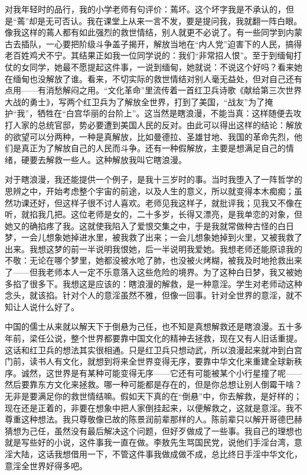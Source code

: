对我年轻时的品行，我的小学老师有句评价：蔫坏。这个坏字我是不承认的，但是“蔫”却是无可否认。我在课堂上从来一言不发，要是提问我，我就翻一阵白眼。像我这样的蔫人都有如此强烈的救世情结，别人就更不必说了。有一些同学到内蒙古去插队，一心要把阶级斗争盖子揭开，解放当地在“内人党”迫害下的人民，搞得老百姓鸡犬不宁。其结果正如我一位同学说的：我们“非常招人恨”。至于到缅甸打仗的女同学，她最不愿提起这件事，一说到缅甸，她就说：不说这个好吗？看来她在缅甸也没解放了谁。看来，不切实际的救世情结对别人毫无益处，但对自己还有点用——有消愁解闷之用。“文化革命”里流传着一首红卫兵诗歌《献给第三次世界大战的勇士》，写两个红卫兵为了解放全世界，打到了美国，“战友”为了掩护“我”，牺牲在“白宫华丽的台阶上”。这当然是瞎浪漫，不能当真：这样随便去攻打人家的总统官邸，势必要遭到美国人民的反对。由此可以得出这样的结论：解放的欲望可以分两种，一种是真解放，比如曼德拉、圣雄甘地、我国的革命先烈，他们是真正为了解放自己的人民而斗争。还有一种假解放，主要是想满足自己的情绪，硬要去解救一些人。这种解放我叫它瞎浪漫。 

对于瞎浪漫，我还能提供一个例子，是我十三岁时的事。当时我堕入了一阵哲学的思辨之中，开始考虑整个宇宙的前途，以及人生的意义，所以就变得本木痴痴；虽然功课还好，但这样子很不讨人喜欢。老师见我这样子，就批评我；见我又不像在听，就掐我几把。这位老师是女的，二十多岁，长得又漂亮，是我单恋的对象，但她又的确掐疼了我。这就使我陷入了爱恨交集之中，于是我就常做种古怪的白日梦，一会儿想象她掉进水里，被我救了出来；一会儿想象她掉到火里，又被我救了出来。我想这梦的前一半说明我恨她，后一半说明我爱她。我想老师还能原谅我的不敬：无论在哪个梦里，她都没被水呛了肺，也没被火烤糊，被我及时地抢救出来了——但我老师本人一定不乐意落入这些危险的境界。为了这种白日梦，我又被她多掐了很多下。我想这是应该的：瞎浪漫的解救，是一种意淫。学生对老师动这种念头，就该掐。针对个人的意淫虽然不雅，但像一回事。针对全世界的意淫，就不知让人说什么好了。 

中国的儒士从来就以解天下于倒悬为己任，也不知是真想解救还是瞎浪漫。五十多年前，梁任公说，整个世界都要靠中国文化的精神去拯救，现在又有人旧话重提。这话和红卫兵的想法其实很相通。只是红卫兵只想动武，所以浪漫起来就冲到白宫门前，读书人有文化，就想到将来全世界变得无序，要靠中华文化来重建全球新秩序。诚然，这世界是有某种可能变得无序——它还有可能被某个小行星撞了呢——然后要靠东方文化来拯救。哪一种可能都是存在的，但是你总想让别人倒霉干啥？无非是要满足你的救世情结嘛。假如天下真的在“倒悬”中，你去解救，是好样的；现在还是正着的，非要在想象中把人家倒挂起来，以便解救之，这就是意淫。我不尊重这种想法。我只尊敬像已故的陈景润前辈那样的人。陈前辈只以解开哥德巴赫猜想为己任，虽然没有最后解决这个问题，但好歹做成了一些事。我自己的理想也就是写些好的小说，这件事我一直在做。李敖先生骂国民党，说他们手淫台湾，意淫大陆，这话我想借用一下，不管这件事我做成做不成，总比终日手淫中华文化，意淫全世界好得多吧。

